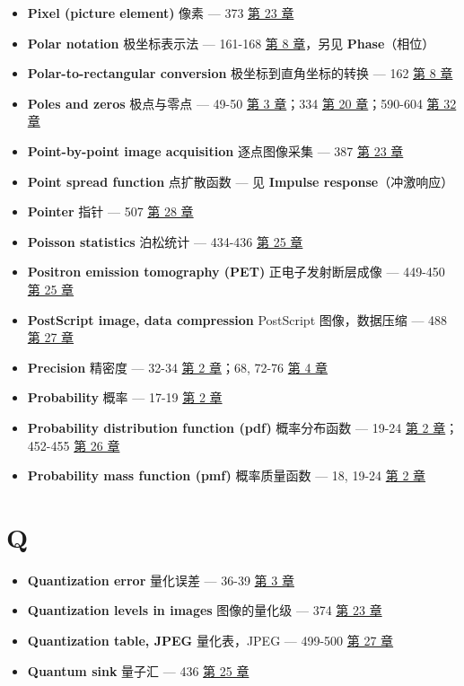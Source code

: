 \begin{itemize}
\item
  \textbf{Pixel (picture element)} 像素 --- 373 
  \hyperref[ch-23]{第 23 章}
\item
  \textbf{Polar notation} 极坐标表示法 --- 161-168 
  \hyperref[ch-08]{第 8 章}，另见 \textbf{Phase}（相位）
\item
  \textbf{Polar-to-rectangular conversion} 极坐标到直角坐标的转换 ---
  162  \hyperref[ch-08]{第 8 章}
\item
  \textbf{Poles and zeros} 极点与零点 --- 49-50 
  \hyperref[ch-03]{第 3 章}；334  \hyperref[ch-20]{第 20
  章}；590-604  \hyperref[ch-32]{第 32 章}
\item
  \textbf{Point-by-point image acquisition} 逐点图像采集 --- 387
   \hyperref[ch-23]{第 23 章}
\item
  \textbf{Point spread function} 点扩散函数 --- 见 \textbf{Impulse
  response}（冲激响应）
\item
  \textbf{Pointer} 指针 --- 507  \hyperref[ch-28]{第 28 章}
\item
  \textbf{Poisson statistics} 泊松统计 --- 434-436 
  \hyperref[ch-25]{第 25 章}
\item
  \textbf{Positron emission tomography (PET)} 正电子发射断层成像 ---
  449-450  \hyperref[ch-25]{第 25 章}
\item
  \textbf{PostScript image, data compression} PostScript 图像，数据压缩
  --- 488  \hyperref[ch-27]{第 27 章}
\item
  \textbf{Precision} 精密度 --- 32-34  \hyperref[ch-02]{第 2
  章}；68, 72-76  \hyperref[ch-04]{第 4 章}
\item
  \textbf{Probability} 概率 --- 17-19  \hyperref[ch-02]{第 2
  章}
\item
  \textbf{Probability distribution function (pdf)} 概率分布函数 ---
  19-24  \hyperref[ch-02]{第 2 章}；452-455 
  \hyperref[ch-26]{第 26 章}
\item
  \textbf{Probability mass function (pmf)} 概率质量函数 --- 18, 19-24
   \hyperref[ch-02]{第 2 章}
\end{itemize}

\section{Q}

\begin{itemize}
\tightlist
\item
  \textbf{Quantization error} 量化误差 --- 36-39 
  \hyperref[ch-03]{第 3 章}
\item
  \textbf{Quantization levels in images} 图像的量化级 --- 374 
  \hyperref[ch-23]{第 23 章}
\item
  \textbf{Quantization table, JPEG} 量化表，JPEG --- 499-500 
  \hyperref[ch-27]{第 27 章}
\item
  \textbf{Quantum sink} 量子汇 --- 436  \hyperref[ch-25]{第 25
  章}
\end{itemize}

